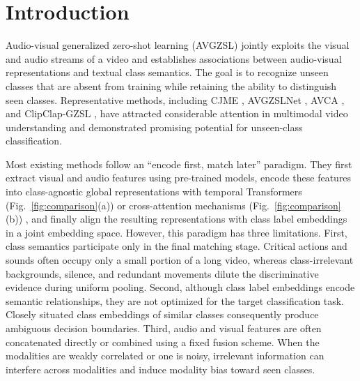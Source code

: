 
\section{Introduction}\label{sec:introduction}



Audio-visual generalized zero-shot learning (AVGZSL) jointly exploits the visual and audio streams of a video and establishes associations between audio-visual representations and textual class semantics. The goal is to recognize unseen classes that are absent from training while retaining the ability to distinguish seen classes. Representative methods, including CJME \cite{parida2020cjme}, AVGZSLNet \cite{mazumder2021avgzslnet}, AVCA \cite{mercea2022avca}, and ClipClap-GZSL \cite{kurzendorfer2024clipclap}, have attracted considerable attention in multimodal video understanding and demonstrated promising potential for unseen-class classification.

Most existing methods follow an \textquotedblleft{}encode first, match later\textquotedblright{} paradigm. They first extract visual and audio features using pre-trained models, encode these features into class-agnostic global representations with temporal Transformers (Fig.~\ref{fig:comparison}(a)) \cite{mercea2022tcaf} or cross-attention mechanisms (Fig.~\ref{fig:comparison}(b)) \cite{mercea2022avca}, and finally align the resulting representations with class label embeddings in a joint embedding space. However, this paradigm has three limitations. First, class semantics participate only in the final matching stage. Critical actions and sounds often occupy only a small portion of a long video, whereas class-irrelevant backgrounds, silence, and redundant movements dilute the discriminative evidence during uniform pooling. Second, although class label embeddings encode semantic relationships, they are not optimized for the target classification task. Closely situated class embeddings of similar classes consequently produce ambiguous decision boundaries. Third, audio and visual features are often concatenated directly or combined using a fixed fusion scheme. When the modalities are weakly correlated or one is noisy, irrelevant information can interfere across modalities and induce modality bias toward seen classes.





